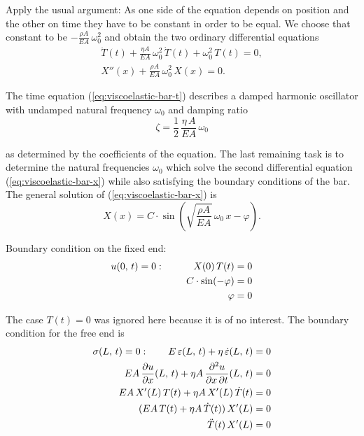 Apply the usual argument: As one side of the equation depends on position and the other on time they have to be constant in order to be equal. We choose that constant to be $-\frac{\rho A}{EA}\,\omega_0^2$ and obtain the two ordinary differential equations
%
\begin{align}
\ddot{T}(t) + \frac{\eta A}{EA}\,\omega_0^2\,\dot{T}(t) + \omega_0^2\,T(t) = 0,\label{eq:viscoelastic-bar-t} \\
X''(x) + \frac{\rho A}{EA}\,\omega_0^2\,X(x) = 0.\label{eq:viscoelastic-bar-x}
\end{align}

The time equation (\ref{eq:viscoelastic-bar-t}) describes a damped harmonic oscillator with undamped natural frequency $\omega_0$ and damping ratio
%
\begin{equation}
\zeta = \frac{1}{2}\,\frac{\eta\,A}{EA}\,\omega_0\label{eq:viscoelastic-bar-result-zeta}
\end{equation}

as determined by the coefficients of the equation. The last remaining task is to determine the natural frequencies $\omega_0$ which solve the second differential equation (\ref{eq:viscoelastic-bar-x}) while also satisfying the boundary conditions of the bar. The general solution of (\ref{eq:viscoelastic-bar-x}) is
%
\begin{equation}
X(x) = C\cdot\sin\left(\sqrt{\frac{\rho A}{EA}}\,\omega_0\,x - \varphi\right).
\end{equation}

Boundary condition on the fixed end:
%
\begin{align}
u(0,\,t) = 0: \quad\quad\quad X(0)\,T(t) &= 0 \notag \\
C\cdot\sin(-\varphi) &= 0 \notag \\
\varphi &= 0
\end{align}

The case $T(t) = 0$ was ignored here because it is of no interest. The boundary condition for the free end is
%
\begin{align}
\sigma(L,\,t) = 0: \quad\quad E\,\varepsilon(L,\,t) + \eta\,\dot{\varepsilon}(L,\,t) &= 0 \notag \\
EA\,\frac{\partial u}{\partial x}(L,\,t) + \eta A\,\frac{\partial^2 u}{\partial x\,\partial t}(L,\,t) &= 0 \notag \\
EA\,X'(L)\,T(t) + \eta A\,X'(L)\,\dot{T}(t) &= 0 \notag \\
(EA\,T(t) + \eta A\,\dot{T}(t))\,X'(L) &= 0 \notag \\
\ddot{T}(t)\,X'(L) &= 0 \notag
\end{align}

